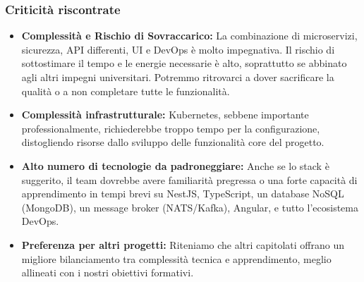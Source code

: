 \documentclass{article}
\begin{document}
	\subsubsection{Criticità riscontrate}
	\begin{itemize}
		\item \textbf{Complessità e Rischio di Sovraccarico:} La combinazione di microservizi, sicurezza, API differenti, UI e DevOps è molto impegnativa. Il rischio di sottostimare il tempo e le energie necessarie è alto, soprattutto se abbinato agli altri impegni universitari. Potremmo ritrovarci a dover sacrificare la qualità o a non completare tutte le funzionalità.
		\item \textbf{Complessità infrastrutturale:} Kubernetes, sebbene importante professionalmente, richiederebbe troppo tempo per la configurazione, distogliendo risorse dallo sviluppo delle funzionalità core del progetto.
		\item \textbf{Alto numero di tecnologie da padroneggiare:}  Anche se lo stack è suggerito, il team dovrebbe avere familiarità pregressa o una forte capacità di apprendimento in tempi brevi su NestJS, TypeScript, un database NoSQL (MongoDB), un message broker (NATS/Kafka), Angular, e tutto l'ecosistema DevOps.
        \item \textbf{Preferenza per altri progetti:} Riteniamo che altri capitolati offrano un migliore bilanciamento tra complessità tecnica e apprendimento, meglio allineati con i nostri obiettivi formativi.
    \end{itemize}
	
\end{document}
